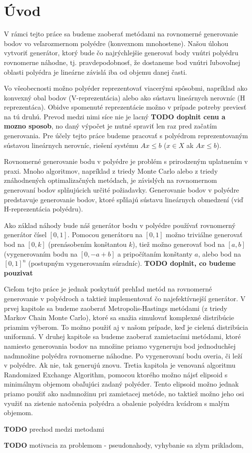 \chapter*{Úvod} %

V rámci tejto práce sa budeme zaoberať metódami na rovnomerné generovanie bodov vo veľarozmernom polyédre (konvexnom mnohostene). Našou úlohou vytvoriť generátor, ktorý bude čo najrýchlejšie generovať body vnútri polyédru rovnomerne náhodne, tj. pravdepodobnosť, že dostaneme bod vnútri ľubovoľnej oblasti polyédra je lineárne závislá iba od objemu danej časti.

Vo všeobecnosti možno polyéder reprezentovať viacerými spôsobmi, napríklad ako konvexný obal bodov (V-reprezentácia) alebo ako sústavu lineárnych nerovníc (H reprezentáca). Obidve spomenuté reprezentácie možno v prípade potreby previesť na tú druhú. Prevod medzi nimi síce nie je lacný \textbf{TODO doplnit cenu a mozno sposob}, no daný výpočet je nutné spraviť len raz pred začatím generovania. Pre účely tejto práce budeme pracovať s polyédrom reprezentovaným sústavou lineárnych nerovníc, riešení systému $Ax \leq b$ ($x \in X$ ak $Ax \leq b$).

Rovnomerné generovanie bodu v polyédre je problém s prirodzeným uplatnením v praxi. Mnoho algoritmov, napríklad z triedy Monte Carlo alebo z triedy znáhodnených optimalizačných metódach, je závislých na rovnomernom generovaní bodov splňujúcich určité požiadavky.
Generovanie bodov v polyédre predstavuje generovanie bodov, ktoré spľňajú sústavu lineárnych obmedzení (viď H-reprezentácia polyédru).

Ako základ náhody bude náš generátor bodu v polyédre používať rovnomerný generátor čísel $[0,1]$. Pomocou generátoru na $[0,1]$ možno triviálne generovať bod na $[0,k]$ (prenásobením konštantou $k$), tiež možno generovať bod na $[a,b]$ (vygenerovaním bodu na $[0, -a+b]$ a pripočítaním konštanty $a$, alebo bod na $[0,1]^n$ (postupným vygenerovaním súradníc). \textbf{TODO doplnit, co budeme pouzivat}

Cieľom tejto práce je jednak poskytnúť prehľad metód na rovnomerné generovanie v polyédroch a taktiež implementovať čo najefektívnejší generátor.
V prvej kapitole sa budeme zaoberať Metropolis-Hastings metódami (z triedy Markov Chain Monte Carlo), ktoré sa snažia simulovať komplexné distribúcie priamim výberom. To možno použiť aj v našom prípade, keď je cielená distribúcia uniformná.
V druhej kapitole sa budeme zaoberať zamietacími metódami, ktoré namiesto generovania bodov na množine priamo vygeneruju bod jednoduchšej nadmnožine polyédra rovnomerne náhodne. Po vygenerovaní bodu overia, či leží v polyédre. Ak nie, tak generujú znovu.
Tretia kapitola je venovaná algoritmu Randomized Exchange Algorithm, pomocou ktorého možno nájsť elipsoid s minimálnym objemom obaľujúci zadaný polyéder. Tento elipsoid možno jednak priamo použiť ako nadmnožinu pri zamietacej metóde, no taktiež možno jeho osi využiť na zistenie natočenia polyédra a obalenie polyédra kvádrom s malým objemom.

\textbf{TODO} prechod medzi metodami

\textbf{TODO} motivacia za problemom - pseudonahody, vyhybanie sa zlym prikladom,
